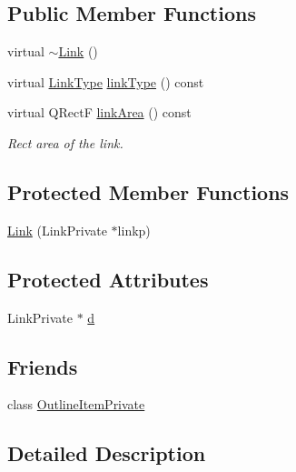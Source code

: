 \subsection*{Public Member Functions}
\begin{DoxyCompactItemize}
\item 
virtual \hyperlink{class_mu_p_d_f_1_1_link_a67672eaaa9b132b64d78079f96f016d7}{$\sim$\-Link} ()
\item 
virtual \hyperlink{class_mu_p_d_f_1_1_link_afdc6828b6e00f323b53d6ae36d0d06b6}{Link\-Type} \hyperlink{class_mu_p_d_f_1_1_link_afe7888c7db760b5a77040cd075911c15}{link\-Type} () const 
\item 
virtual Q\-Rect\-F \hyperlink{class_mu_p_d_f_1_1_link_a09ef952d535704b060e253e869b4c060}{link\-Area} () const 
\begin{DoxyCompactList}\small\item\em Rect area of the link. \end{DoxyCompactList}\end{DoxyCompactItemize}
\subsection*{Protected Member Functions}
\begin{DoxyCompactItemize}
\item 
\hyperlink{class_mu_p_d_f_1_1_link_aafae45b17498aa5b4ddb284563e19bc7}{Link} (Link\-Private $\ast$linkp)
\end{DoxyCompactItemize}
\subsection*{Protected Attributes}
\begin{DoxyCompactItemize}
\item 
Link\-Private $\ast$ \hyperlink{class_mu_p_d_f_1_1_link_a5723c1b46286b89fd7a8fccfa3dc05d2}{d}
\end{DoxyCompactItemize}
\subsection*{Friends}
\begin{DoxyCompactItemize}
\item 
class \hyperlink{class_mu_p_d_f_1_1_link_ab008ed670017e41b6e6bba8707c775d2}{Outline\-Item\-Private}
\end{DoxyCompactItemize}


\subsection{Detailed Description}


